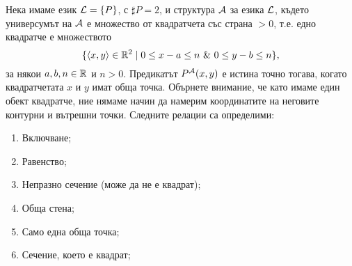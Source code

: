 \begin{problem}
  Нека имаме език $\mathcal{L} = \{P\}$, с $\sharp P = 2$, и структура $\mathcal{A}$ за езика $\mathcal{L}$, където
  универсумът на $\mathcal{A}$ е множество от квадратчета със страна $> 0$, т.е.
  едно квадратче е множеството
  \[\{\langle{x,y}\rangle \in \mathbb{R}^2 \mid 0 \leq x - a \leq n\ \&\ 0 \leq y-b \leq n\},\]
  за някои $a, b, n \in \mathbb{R}$ и $n > 0$.
  Предикатът $P^{\mathcal{A}}(x,y)$ е истина точно тогава, когато квадратчетата $x$ и $y$ имат обща точка.
  Обърнете внимание, че като имаме един обект квадратче, ние нямаме начин да намерим координатите на неговите контурни и вътрешни точки.
  Следните релации са определими:
  \begin{enumerate}[1)]
  \item
    Включване;
  \item
    Равенство;
  \item
    Непразно сечение (може да не е квадрат);
  \item
    Обща стена;
  \item
    Само една обща точка;
  \item
    Сечение, което е квадрат;
  \end{enumerate}
\end{problem}
